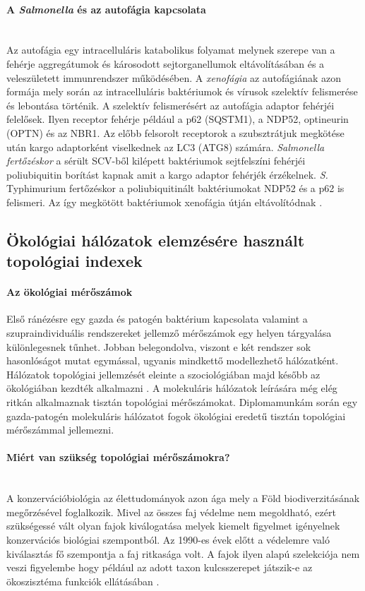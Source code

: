 \documentclass[a4paper,12pt]{article}
\begin{document}
		 \paragraph{A \textit{Salmonella} és az autofágia kapcsolata} \mbox{}\\
		 Az autofágia egy intracelluláris katabolikus folyamat melynek szerepe van a fehérje aggregátumok és károsodott sejtorganellumok eltávolításában és a veleszületett immunrendszer működésében. A \textit{xenofágia} az autofágiának azon formája mely során az intracelluláris baktériumok és vírusok szelektív felismerése és lebontása történik. A szelektív felismerésért az autofágia adaptor fehérjéi felelősek. Ilyen receptor fehérje például a p62 (SQSTM1), a NDP52, optineurin (OPTN) és az NBR1. Az előbb felsorolt receptorok a szubsztrátjuk megkötése után kargo adaptorként viselkednek az LC3 (ATG8) számára. \textit{Salmonella fertőzéskor} a sérült SCV-ből kilépett baktériumok sejtfelszíni fehérjéi poliubiquitin borítást kapnak amit a kargo adaptor fehérjék érzékelnek. \textit{S.} Typhimurium fertőzéskor a poliubiquitinált baktériumokat NDP52 és a p62 is felismeri. Az így megkötött baktériumok xenofágia útján eltávolítódnak \cite{salmonella_authopagy_intro}.
	
	\subsection{Ökológiai hálózatok elemzésére használt topológiai indexek}
	
	 \paragraph{Az ökológiai mérőszámok}
	 Első ránézésre egy gazda és patogén baktérium kapcsolata valamint a szupraindividuális rendszereket jellemző mérőszámok egy helyen tárgyalása különlegesnek tűnhet. Jobban belegondolva, viszont e két rendszer sok hasonlóságot mutat egymással, ugyanis mindkettő modellezhető hálózatként. Hálózatok topológiai jellemzését eleinte a szociológiában majd később az ökológiában kezdték alkalmazni \cite{top_indexes}. A molekuláris hálózatok leírására még elég ritkán alkalmaznak tisztán topológiai mérőszámokat. Diplomamunkám során egy gazda-patogén molekuláris hálózatot fogok ökológiai eredetű tisztán topológiai mérőszámmal jellemezni. 
	 
	 \paragraph{Miért van szükség topológiai mérőszámokra?} \mbox{}\\ %
	 A konzervációbiológia az élettudományok azon ága mely a Föld biodiverzitásának megőrzésével foglalkozik. Mivel az összes faj védelme nem megoldható, ezért szükségessé vált olyan fajok kiválogatása melyek kiemelt figyelmet igényelnek konzervációs biológiai szempontból\cite{new_zeland}. Az 1990-es évek előtt a védelemre való kiválasztás fő szempontja a faj ritkasága volt.  A fajok ilyen alapú szelekciója nem veszi figyelembe hogy például az adott taxon kulcsszerepet játszik-e az ökoszisztéma funkciók ellátásában \cite{jordan_comparison}.
	 
\end{document}

